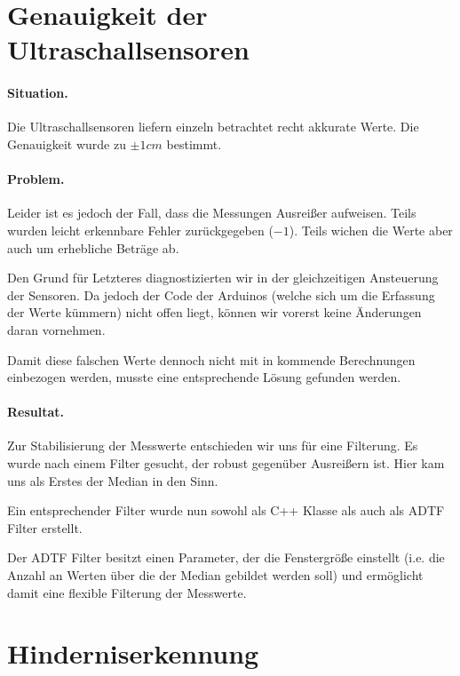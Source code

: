 \documentclass[a4paper,12pt]{report}
\begin{document}
\section{Genauigkeit der Ultraschallsensoren}

	\paragraph{Situation.}
	Die Ultraschallsensoren liefern einzeln betrachtet recht akkurate Werte.
	Die Genauigkeit wurde zu $\pm1cm$ bestimmt.

	\paragraph{Problem.}
	Leider ist es jedoch der Fall, dass die Messungen Ausreißer aufweisen.
	Teils wurden leicht erkennbare Fehler zurückgegeben ($-1$). Teils wichen die Werte aber auch um erhebliche Beträge ab.

	Den Grund für Letzteres diagnostizierten wir in der gleichzeitigen Ansteuerung der Sensoren.
	Da jedoch der Code der Arduinos (welche sich um die Erfassung der Werte kümmern) nicht offen liegt, können wir vorerst keine Änderungen daran vornehmen.

	Damit diese falschen Werte dennoch nicht mit in kommende Berechnungen einbezogen werden, musste eine entsprechende Lösung gefunden werden.

	\paragraph{Resultat.} %
	Zur Stabilisierung der Messwerte entschieden wir uns für eine Filterung.
	Es wurde nach einem Filter gesucht, der robust gegenüber Ausreißern ist.
	Hier kam uns als Erstes der Median in den Sinn.

	Ein entsprechender Filter wurde nun sowohl als C++ Klasse als auch als ADTF Filter erstellt.

	Der ADTF Filter besitzt einen Parameter, der die Fenstergröße einstellt (i.e. die Anzahl an Werten über die der Median gebildet werden soll) und ermöglicht damit eine flexible Filterung der Messwerte.

\section{Hinderniserkennung}
\end{document}
